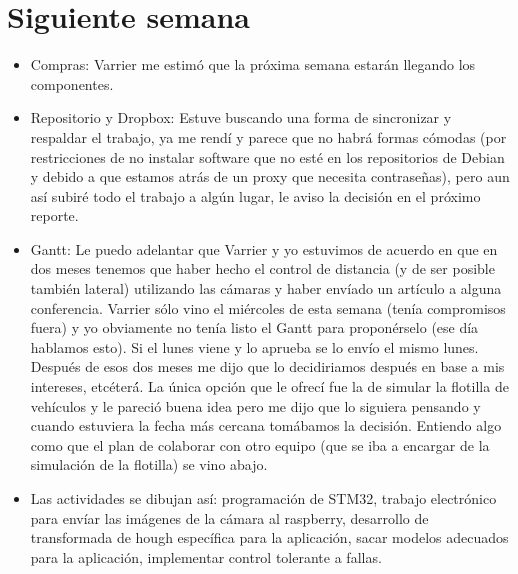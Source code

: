 \documentclass[paper=a4, fontsize=11pt]{scrartcl} %
\numberwithin{equation}{section}
\numberwithin{figure}{section}
\numberwithin{table}{section}
\begin{document}
\section{Siguiente semana}
\begin{itemize}
\item Compras: Varrier me estim\'{o} que la pr\'{o}xima semana estar\'{a}n llegando los componentes.
\item Repositorio y Dropbox: Estuve buscando una forma de sincronizar y respaldar el trabajo, ya me rend\'{i} y parece que no habr\'{a} formas c\'{o}modas (por restricciones de no instalar software que no est\'{e} en los repositorios de Debian y debido a que estamos atr\'{a}s de un proxy que necesita contraseñas), pero aun as\'{i} subir\'{e} todo el trabajo a alg\'{u}n lugar, le aviso la decisi\'{o}n en el pr\'{o}ximo reporte.
\item Gantt: Le puedo adelantar que Varrier y yo estuvimos de acuerdo en que en dos meses tenemos que haber hecho el control de distancia (y de ser posible tambi\'{e}n lateral) utilizando las c\'{a}maras y haber env\'{i}ado un art\'{i}culo a alguna conferencia. Varrier s\'{o}lo vino el mi\'{e}rcoles de esta semana (ten\'{i}a compromisos fuera) y yo obviamente no ten\'{i}a listo el Gantt para propon\'{e}rselo (ese d\'{i}a hablamos esto). Si el lunes viene y lo aprueba se lo env\'{i}o el mismo lunes. Despu\'{e}s de esos dos meses me dijo que lo decidiriamos despu\'{e}s en base a mis intereses, etc\'{e}ter\'{\'{a}}. La \'{u}nica opci\'{o}n que le ofrec\'{i} fue la de simular la flotilla de veh\'{i}culos y le pareci\'{o} buena idea pero me dijo que lo siguiera pensando y cuando estuviera la fecha m\'{a}s cercana tom\'{a}bamos la decisi\'{o}n. Entiendo algo como que el plan de colaborar con otro equipo (que se iba a encargar de la simulaci\'{o}n de la flotilla) se vino abajo.
\item Las actividades se dibujan as\'{i}: programaci\'{o}n de STM32, trabajo electr\'{o}nico para env\'{i}ar las im\'{a}genes de la c\'{a}mara al raspberry, desarrollo de transformada de hough espec\'{i}fica para la aplicaci\'{o}n, sacar modelos adecuados para la aplicaci\'{o}n, implementar control tolerante a fallas.
\end{itemize}
\end{document}
